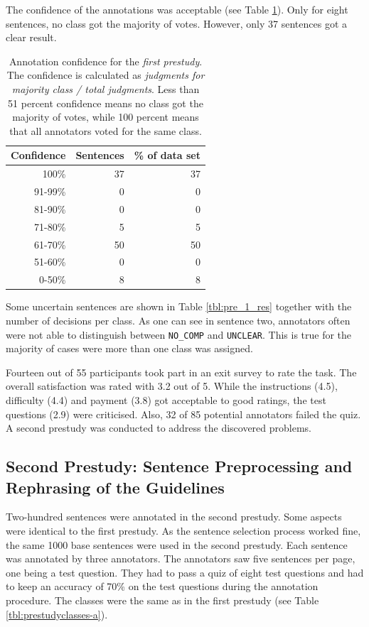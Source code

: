 The confidence of the annotations was acceptable (see Table \ref{fig:pre_a_agg}). Only for eight sentences, no class got the majority of votes. However, only 37 sentences got a clear result.

\begin{table}[htbp]
\caption{Annotation confidence for the \emph{first prestudy}. The confidence is calculated as \emph{judgments for majority class / total judgments}. Less than 51 percent confidence means no class got the majority of votes, while 100 percent means that all annotators voted for the same class.}
\label{fig:pre_a_agg}
\centering
\begin{tabular}{@{}rrr@{}}
\toprule
Confidence & Sentences & \% of data set \\
\midrule
100\%	&	37	&	37	 \\ 
91-99\%	&	0	&	0	 \\ 
81-90\%	&	0	&	0	 \\ 
71-80\%	&	5	&	5	 \\ 
61-70\%	&	50	&	50	 \\ 
51-60\%	&	0	&	0	 \\ 
0-50\%	&	8	&	8	 \\ 
\bottomrule
\end{tabular}
\end{table}




Some uncertain sentences are shown in Table \ref{tbl:pre_1_res} together with the number of decisions per class. As one can see in sentence two, annotators often were not able to distinguish between \texttt{NO\_COMP} and \texttt{UNCLEAR}. This is true for the majority of cases were more than one class was assigned.



Fourteen out of 55 participants took part in an exit survey to rate the task. The overall satisfaction was rated with 3.2 out of 5. While the instructions (4.5), difficulty (4.4) and payment (3.8) got acceptable to good ratings, the test questions (2.9) were criticised. Also, 32 of 85 potential annotators failed the quiz. A second prestudy was conducted to address the discovered problems.


\FloatBarrier
\subsection{Second Prestudy: Sentence Preprocessing and Rephrasing of the Guidelines}
Two-hundred sentences were annotated in the second prestudy. Some aspects were identical to the first prestudy. As the sentence selection process worked fine, the same 1000 base sentences were used in the second prestudy.  Each sentence was annotated by three annotators. The annotators saw five sentences per page, one being a test question. They had to pass a quiz of eight test questions and had to keep an accuracy of 70\% on the test questions during the annotation procedure. The classes were the same as in the first prestudy (see Table \ref{tbl:prestudyclasses-a}).

